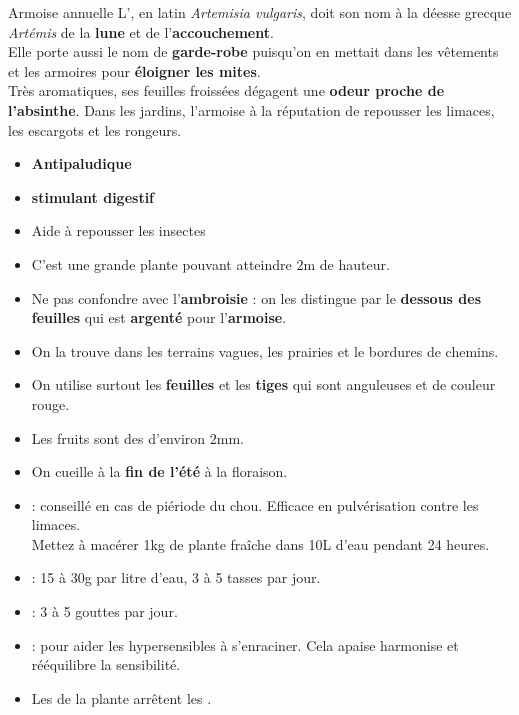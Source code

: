 \renewcommand{\cita}{
    \phantom{a}\citer{En tant que plante magique, elle servait pour les prophéties et la divinitation.\\On la fumait}{Les plantes des druides}
}
\ficheidentiteplantelong
{Armoise annuelle}
{%
    L', en latin \textit{Artemisia vulgaris}, doit son nom
    à la déesse grecque \textit{Artémis} de la \textbf{lune} et de l'\textbf{accouchement}.\\
    Elle porte aussi le nom de \textbf{garde-robe} puisqu'on en mettait dans les vêtements et les armoires pour \textbf{éloigner les mites}.\\

    Très aromatiques, ses feuilles froissées dégagent une \textbf{odeur proche de l'absinthe}.
    Dans les jardins, l'armoise à la réputation de repousser les limaces, les escargots et les rongeurs.
}
{%
    \begin{itemize}[label = \bcplume]
        \item \textbf{Antipaludique}
        \item \textbf{stimulant digestif}
        \item Aide à repousser les insectes
    \end{itemize}
}
{%
    \begin{itemize}[label = \bcplume]
        \item C'est une grande plante pouvant atteindre $2$m de hauteur.
        \item Ne pas confondre avec l'\textbf{ambroisie} : on les distingue par le \textbf{dessous des feuilles} qui est \textbf{argenté} pour l'\textbf{armoise}.
        \item On la trouve dans les terrains vagues, les prairies et le bordures de chemins.
        \item On utilise surtout les \textbf{feuilles} et les \textbf{tiges} qui sont anguleuses et de couleur rouge.
        \item Les fruits sont des  d'environ $2$mm.
        \item On cueille à la \textbf{fin de l'été} à la floraison.
    \end{itemize}
}
{%
    \begin{itemize}[label = \bccrayon]
        \item {} : conseillé en cas de piériode du chou. Efficace en pulvérisation contre les limaces.\\ Mettez à macérer 1kg de plante fraîche dans 10L d'eau pendant 24 heures.
        \item {} : 15 à 30g par litre d'eau, 3 à 5 tasses par jour.
        \item {} : 3 à 5 gouttes par jour.
        \item {} : pour aider les hypersensibles à s'enraciner. Cela apaise harmonise et rééquilibre la sensibilité.
        \item Les  de la plante arrêtent les .
    \end{itemize}
}
